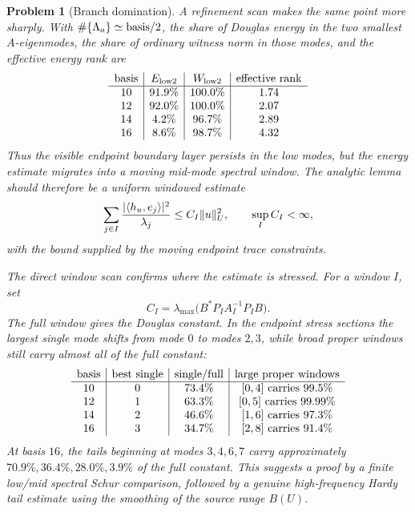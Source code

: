 \documentclass[11pt]{article}
\newtheorem{problem}[theorem]{Problem}
\begin{document}
\begin{problem}[Branch domination]
A refinement scan makes the same point more sharply.  With
\(\#\{\Lambda_a\}\simeq{\rm basis}/2\), the share of Douglas energy in the two
smallest \(A\)-eigenmodes, the share of ordinary witness norm in those modes,
and the effective energy rank are
\[
\begin{array}{c|c|c|c}
{\rm basis} & E_{\rm low2} & W_{\rm low2} & {\rm effective\ rank}\\
\hline
10 & 91.9\% & 100.0\% & 1.74\\
12 & 92.0\% & 100.0\% & 2.07\\
14 &  4.2\% &  96.7\% & 2.89\\
16 &  8.6\% &  98.7\% & 4.32
\end{array}
\]
Thus the visible endpoint boundary layer persists in the low modes, but the
energy estimate migrates into a moving mid-mode spectral window.  The analytic
lemma should therefore be a uniform windowed estimate
\[
  \sum_{j\in I}{|\langle h_u,e_j\rangle|^2\over \lambda_j}
  \le C_I\|u\|_U^2,\qquad \sup_I C_I<\infty,
\]
with the bound supplied by the moving endpoint trace constraints.

The direct window scan confirms where the estimate is stressed.  For a window
\(I\), set
\[
  C_I=\lambda_{\max}\bigl(B^*P_I A_I^{-1}P_I B\bigr).
\]
The full window gives the Douglas constant.  In the endpoint stress sections
the largest single mode shifts from mode \(0\) to modes \(2,3\), while broad
proper windows still carry almost all of the full constant:
\[
\begin{array}{c|c|c|c}
{\rm basis} & {\rm best\ single} & {\rm single/full}
& {\rm large\ proper\ windows}\\
\hline
10 & 0 & 73.4\% & [0,4]\ {\rm carries}\ 99.5\%\\
12 & 1 & 63.3\% & [0,5]\ {\rm carries}\ 99.99\%\\
14 & 2 & 46.6\% & [1,6]\ {\rm carries}\ 97.3\%\\
16 & 3 & 34.7\% & [2,8]\ {\rm carries}\ 91.4\%
\end{array}
\]
At basis \(16\), the tails beginning at modes \(3,4,6,7\) carry approximately
\(70.9\%,36.4\%,28.0\%,3.9\%\) of the full constant.  This suggests a proof
by a finite low/mid spectral Schur comparison, followed by a genuine
high-frequency Hardy tail estimate using the smoothing of the source range
\(B(U)\).


\end{problem}
\end{document}
